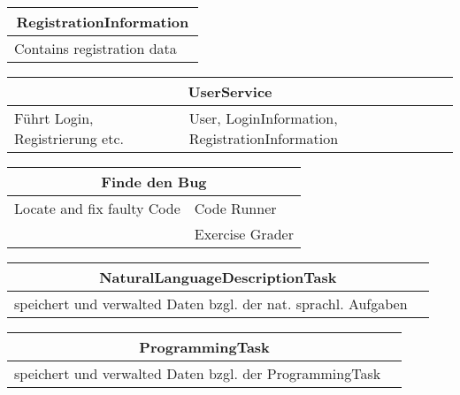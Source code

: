 \documentclass[11pt]{article}
\begin{document}
\begin{table}[h]
\begin{tabularx}{\textwidth}{|X|X|}
\hline
\multicolumn{2}{|c|}{RegistrationInformation}\\ \hline
Contains registration data& \\  \hline
\end{tabularx}
\end{table}

\begin{table}[h]
\begin{tabularx}{\textwidth}{|X|X|}
\hline
\multicolumn{2}{|c|}{UserService}\\ \hline
Führt Login, Registrierung etc. & User, LoginInformation, RegistrationInformation\\  \hline
\end{tabularx}
\end{table}    

\begin{table}[h]
\begin{tabularx}{\textwidth}{|X|X|}
\hline
\multicolumn{2}{|c|}{Finde den Bug}\\ \hline
Locate and fix faulty Code&Code Runner \\  \hline
&Exercise Grader \\ \hline
\end{tabularx}
\end{table}

\begin{table}[h]
\begin{tabularx}{\textwidth}{|X|X|}
\hline
\multicolumn{2}{|c|}{NaturalLanguageDescriptionTask}\\ \hline
speichert und verwalted Daten bzgl. der nat. sprachl. Aufgaben& \\  \hline
\end{tabularx}
\end{table}

\begin{table}[h]
\begin{tabularx}{\textwidth}{|X|X|}
\hline
\multicolumn{2}{|c|}{ProgrammingTask}\\ \hline
speichert und verwalted Daten bzgl. der ProgrammingTask & \\  \hline
\end{tabularx}
\end{table}
\end{document}
